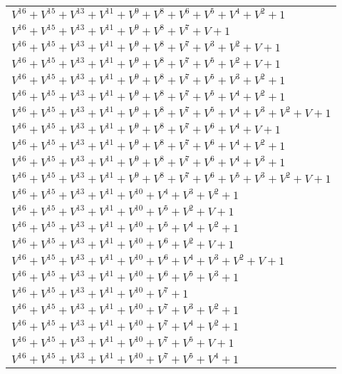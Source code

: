 \documentclass[12pt]{article}
\begin{document}
\begin{adjustwidth}{-4cm}{}
\begin{center}
\begin{longtable}{|l|}
$V^{16}  +V^{15}  +V^{13}  +V^{11}  +V^{9}  +V^{8}  +V^{6}  +V^{5}  +V^{4}  +V^{2}  + 1$ \\
$V^{16}  +V^{15}  +V^{13}  +V^{11}  +V^{9}  +V^{8}  +V^{7}  + V + 1$ \\
$V^{16}  +V^{15}  +V^{13}  +V^{11}  +V^{9}  +V^{8}  +V^{7}  +V^{3}  +V^{2}  + V + 1$ \\
$V^{16}  +V^{15}  +V^{13}  +V^{11}  +V^{9}  +V^{8}  +V^{7}  +V^{5}  +V^{2}  + V + 1$ \\
$V^{16}  +V^{15}  +V^{13}  +V^{11}  +V^{9}  +V^{8}  +V^{7}  +V^{5}  +V^{3}  +V^{2}  + 1$ \\
$V^{16}  +V^{15}  +V^{13}  +V^{11}  +V^{9}  +V^{8}  +V^{7}  +V^{5}  +V^{4}  +V^{2}  + 1$ \\
$V^{16}  +V^{15}  +V^{13}  +V^{11}  +V^{9}  +V^{8}  +V^{7}  +V^{5}  +V^{4}  +V^{3}  +V^{2}  + V + 1$ \\
$V^{16}  +V^{15}  +V^{13}  +V^{11}  +V^{9}  +V^{8}  +V^{7}  +V^{6}  +V^{4}  + V + 1$ \\
$V^{16}  +V^{15}  +V^{13}  +V^{11}  +V^{9}  +V^{8}  +V^{7}  +V^{6}  +V^{4}  +V^{2}  + 1$ \\
$V^{16}  +V^{15}  +V^{13}  +V^{11}  +V^{9}  +V^{8}  +V^{7}  +V^{6}  +V^{4}  +V^{3}  + 1$ \\
$V^{16}  +V^{15}  +V^{13}  +V^{11}  +V^{9}  +V^{8}  +V^{7}  +V^{6}  +V^{5}  +V^{3}  +V^{2}  + V + 1$ \\
$V^{16}  +V^{15}  +V^{13}  +V^{11}  +V^{10}  +V^{4}  +V^{3}  +V^{2}  + 1$ \\
$V^{16}  +V^{15}  +V^{13}  +V^{11}  +V^{10}  +V^{5}  +V^{2}  + V + 1$ \\
$V^{16}  +V^{15}  +V^{13}  +V^{11}  +V^{10}  +V^{5}  +V^{4}  +V^{2}  + 1$ \\
$V^{16}  +V^{15}  +V^{13}  +V^{11}  +V^{10}  +V^{6}  +V^{2}  + V + 1$ \\
$V^{16}  +V^{15}  +V^{13}  +V^{11}  +V^{10}  +V^{6}  +V^{4}  +V^{3}  +V^{2}  + V + 1$ \\
$V^{16}  +V^{15}  +V^{13}  +V^{11}  +V^{10}  +V^{6}  +V^{5}  +V^{3}  + 1$ \\
$V^{16}  +V^{15}  +V^{13}  +V^{11}  +V^{10}  +V^{7}  + 1$ \\
$V^{16}  +V^{15}  +V^{13}  +V^{11}  +V^{10}  +V^{7}  +V^{3}  +V^{2}  + 1$ \\
$V^{16}  +V^{15}  +V^{13}  +V^{11}  +V^{10}  +V^{7}  +V^{4}  +V^{2}  + 1$ \\
$V^{16}  +V^{15}  +V^{13}  +V^{11}  +V^{10}  +V^{7}  +V^{5}  + V + 1$ \\
$V^{16}  +V^{15}  +V^{13}  +V^{11}  +V^{10}  +V^{7}  +V^{5}  +V^{4}  + 1$ \\

\end{longtable}
\end{center}
\end{adjustwidth}
\end{document}
